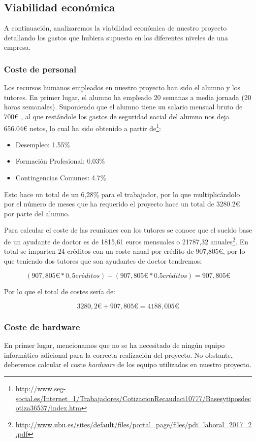 \subsection{Viabilidad económica}
A continuación, analizaremos la viabilidad económica de nuestro proyecto detallando los gastos que hubiera supuesto en los diferentes niveles de una empresa.

\subsubsection{Coste de personal}
Los recursos humanos empleados en nuestro proyecto han sido el alumno y los tutores. En primer lugar, el alumno ha empleado 20 semanas a media jornada (20 horas semanales). Suponiendo que el alumno tiene un salario mensual bruto de 700\euro{} , al que restándole los gastos de seguridad social del alumno nos deja 656.04\euro{} netos, lo cual ha sido obtenido a partir de\footnote{\url{http://www.seg-social.es/Internet_1/Trabajadores/CotizacionRecaudaci10777/Basesytiposdecotiza36537/index.htm}}:

\begin{itemize}
	\item Desempleo: 1.55\%
	\item Formación Profesional: 0.03\%
	\item Contingencias Comunes: 4.7\%
\end{itemize}

Esto hace un total de un 6,28\% para el trabajador, por lo que multiplicándolo por el número de meses que ha requerido el proyecto hace un total de 3280.2\euro{} por parte del alumno.

Para calcular el coste de las reuniones con los tutores se conoce que el sueldo base de un ayudante de doctor es de 1815,61 euros mensuales o 21787,32 anuales\footnote{\url{http://www.ubu.es/sites/default/files/portal_page/files/pdi_laboral_2017_2.pdf}}. En total se imparten 24 créditos con un coste anual por crédito de 907,805\euro{}, por lo que teniendo dos tutores que son ayudantes de doctor tendremos:

\[ (907,805\euro{} * 0,5 créditos) + (907,805\euro{} * 0.5 créditos) = 907,805\euro{}\]

Por lo que el total de costes sería de:

\[ 3280,2\euro{} + 907,805\euro{} = 4188,005\euro{} \]

\subsubsection{Coste de hardware}
En primer lugar, mencionamos que no se ha necesitado de ningún equipo informático adicional para la correcta realización del proyecto. No obstante, deberemos calcular el coste \textit{hardware} de los equipo utilizados en nuestro proyecto.

